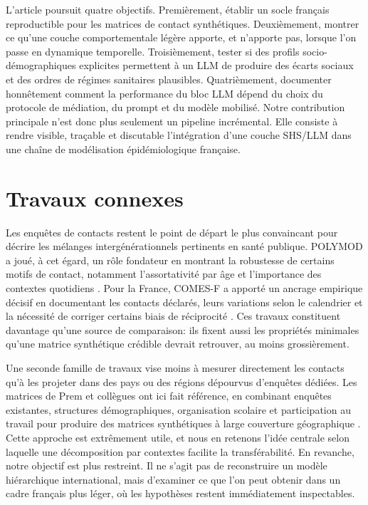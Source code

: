 \documentclass[ROIA,Unicode]{cedram}
\begin{document}
L'article poursuit quatre objectifs. Premièrement, établir un socle français reproductible pour les matrices de contact synthétiques. Deuxièmement, montrer ce qu'une couche comportementale légère apporte, et n'apporte pas, lorsque l'on passe en dynamique temporelle. Troisièmement, tester si des profils socio-démographiques explicites permettent à un LLM de produire des écarts sociaux et des ordres de régimes sanitaires plausibles. Quatrièmement, documenter honnêtement comment la performance du bloc LLM dépend du choix du protocole de médiation, du prompt et du modèle mobilisé. Notre contribution principale n'est donc plus seulement un pipeline incrémental. Elle consiste à rendre visible, traçable et discutable l'intégration d'une couche SHS/LLM dans une chaîne de modélisation épidémiologique française.

\section{Travaux connexes}
Les enquêtes de contacts restent le point de départ le plus convaincant pour décrire les mélanges intergénérationnels pertinents en santé publique. POLYMOD a joué, à cet égard, un rôle fondateur en montrant la robustesse de certains motifs de contact, notamment l'assortativité par âge et l'importance des contextes quotidiens \citep{mossong2008social}. Pour la France, COMES-F a apporté un ancrage empirique décisif en documentant les contacts déclarés, leurs variations selon le calendrier et la nécessité de corriger certains biais de réciprocité \citep{beraud2015french}. Ces travaux constituent davantage qu'une source de comparaison: ils fixent aussi les propriétés minimales qu'une matrice synthétique crédible devrait retrouver, au moins grossièrement.

Une seconde famille de travaux vise moins à mesurer directement les contacts qu'à les projeter dans des pays ou des régions dépourvus d'enquêtes dédiées. Les matrices de Prem et collègues ont ici fait référence, en combinant enquêtes existantes, structures démographiques, organisation scolaire et participation au travail pour produire des matrices synthétiques à large couverture géographique \citep{prem2017projecting,prem2021projecting}. Cette approche est extrêmement utile, et nous en retenons l'idée centrale selon laquelle une décomposition par contextes facilite la transférabilité. En revanche, notre objectif est plus restreint. Il ne s'agit pas de reconstruire un modèle hiérarchique international, mais d'examiner ce que l'on peut obtenir dans un cadre français plus léger, où les hypothèses restent immédiatement inspectables.
\end{document}
